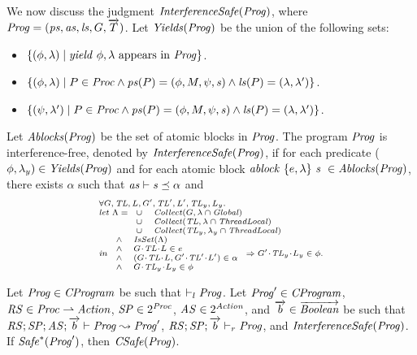 We now discuss the judgment $\mathit{InterferenceSafe}(\mathit{Prog})$,
where $\mathit{Prog} = (\mathit{ps}, \mathit{as}, \mathit{ls}, G, \overrightarrow{T})$. 
Let $\mathit{Yields}(\mathit{Prog})$ be the union of the following sets:
\begin{itemize}
\item
$\{(\phi,\lambda) \mid \mathit{yield}\ \phi,\lambda~\mathrm{appears~in~\mathit{Prog}}\}$.
\item
$\{(\phi,\lambda) \mid P \in \mathit{Proc} \wedge \mathit{ps}(P) = (\phi, M, \psi, \mathit{s}) \wedge \mathit{ls}(P) = (\lambda,\lambda')\}$.
\item
$\{(\psi,\lambda') \mid P \in \mathit{Proc} \wedge \mathit{ps}(P) = (\phi, M, \psi, \mathit{s}) \wedge \mathit{ls}(P) = (\lambda,\lambda')\}$.
\end{itemize}
Let $\mathit{Ablocks}(\mathit{Prog})$ be the set of atomic blocks in $\mathit{Prog}$.
The program $\mathit{Prog}$ is interference-free, denoted by $\mathit{InterferenceSafe}(\mathit{Prog})$,
if for each predicate ($\phi,\lambda_y) \in \mathit{Yields}(\mathit{Prog})$ and 
for each atomic block $\mathit{ablock}\ {\{e,\lambda\}}\ {\mathit{s}}\  \in \mathit{Ablocks}(\mathit{Prog})$, there exists $\alpha$ such that 
$\mathit{as} \vdash \mathit{s} \preceq \alpha$ and 
\[
\scriptsize{
\begin{array}{l}
\forall \varsG,\varsTL,\varsL,\varsG',\varsTL',\varsL',\varsTL_y,\varsL_y.\\ 
\mathit{let}\ \Lambda =
\begin{array}[t]{ll}
\cup & \Collect(\varsG, \lins \cap \Global) \\
\cup & \Collect(\varsTL, \lins \cap \ThreadLocal) \\
\cup & \Collect(\varsTL_y, \lins_y \cap \ThreadLocal) 
\end{array} \\
\mathit{in}\
\begin{array}{ll}
\wedge & \IsSet(\Lambda) \\
\wedge & \MakeStore{\varsG}{\varsTL}{\varsL} \in e \\
\wedge & (\MakeStore{\varsG}{\varsTL}{\varsL}, \MakeStore{\varsG'}{\varsTL'}{\varsL'}) \in \alpha \\
\wedge & \MakeStore{\varsG}{\varsTL_y}{\varsL_y} \in \phi
\end{array}
\Rightarrow \MakeStore{\varsG'}{\varsTL_y}{\varsL_y} \in \phi.
\end{array}
}
\]

\begin{lemma}
Let $\mathit{Prog} \in \mathit{CProgram}$ be such that $\vdash_l \mathit{Prog}$.
Let $\mathit{Prog}' \in \mathit{CProgram}$, $\mathit{RS} \in \mathit{Proc} \rightharpoonup \mathit{Action}$, $\mathit{SP} \in 2^{\mathit{Proc}}$, $\mathit{AS} \in 2^{\mathit{Action}}$,
and $\overrightarrow{b} \in \overrightarrow{\mathit{Boolean}}$ be such that 
$\mathit{RS};\mathit{SP};\mathit{AS};\overrightarrow{b} \vdash \mathit{Prog} \leadsto \mathit{Prog}'$, $\mathit{RS};\mathit{SP};\overrightarrow{b} \vdash_r \mathit{Prog}$, and
$\mathit{InterferenceSafe}(\mathit{Prog})$.
If $\mathit{Safe}^*(\mathit{Prog}')$, then $\mathit{CSafe}(\mathit{Prog})$.
\end{lemma}


